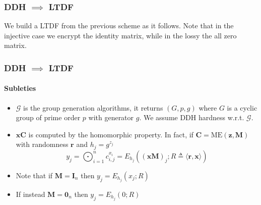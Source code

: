 \documentclass{beamer}
\begin{document}
\begin{frame}
    \frametitle{DDH $\implies$ LTDF}
    We build a LTDF from the previous scheme as it follows. Note
    that in the injective case we encrypt the identity matrix, while
    in the lossy the all zero matrix.
    \begin{center}
        \begin{pchstack}
            \begin{pcvstack}

                \pcvspace

            \end{pcvstack}
        \end{pchstack}
    \end{center}
\end{frame}
\begin{frame}
    \frametitle{DDH $\implies$ LTDF}
    \framesubtitle{Subleties}
    \begin{itemize}
        \item $\mathcal{G}$ is the group generation algorithms, it returns $(G, p, g)$ where
              $G$ is a cyclic group of prime order $p$ with generator $g$. We assume DDH hardness w.r.t. $\mathcal{G}$.
        \item $\mathbf{xC}$ is computed by the homomorphic property.
              In fact, if $\mathbf{C} = \mathrm{ME}(\mathbf{z}, \mathbf{M})$ with randomness $\mathbf{r}$ and $h_j = g^{z_j}$
              \[ y_j = \bigodot_{i=1}^n c_{i,j}^{x_i} = E_{h_j}((\mathbf{xM})_j ; R \triangleq \langle \mathbf{r}, \mathbf{x} \rangle) \]

        \item Note that if $\mathbf{M} = \mathbf{I}_n$ then $y_j = E_{h_j}(x_j; R)$
        \item If instead $\mathbf{M} = \mathbf{0}_n$ then $y_j = E_{h_j}(0; R)$
    \end{itemize}
\end{frame}
\end{document}
